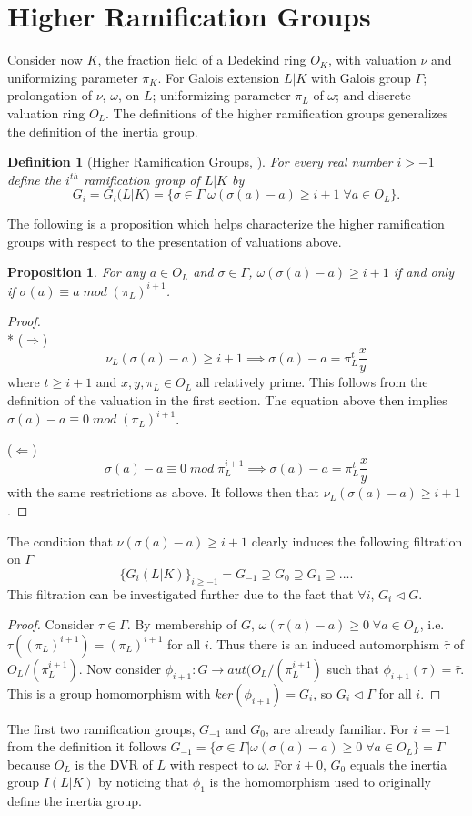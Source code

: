 \documentclass[paper=a4, fontsize=11pt]{scrartcl} %
\numberwithin{equation}{section} %
\numberwithin{figure}{section} %
\numberwithin{table}{section} %
\theoremstyle{break}
\newtheorem{defn}{Definition}
\newtheorem{prop}{Proposition}
\begin{document}
\section{Higher Ramification Groups}
Consider now $K$, the fraction field of a Dedekind ring $O_K$, with valuation $\nu$ and uniformizing parameter $\pi_K$. For Galois extension $L|K$ with Galois group $\Gamma$; prolongation of $\nu$, $\omega$, on $L$; uniformizing parameter $\pi_L$ of $\omega$; and discrete valuation ring $O_L$. The definitions of the higher ramification groups generalizes the definition of the inertia group.
\begin{defn}[Higher Ramification Groups, \cite{Serre}]
For every real number $i > -1$ define the $i^{th}$ ramification group of $L|K$ by
$$
G_i = G_i(L|K) = \{\sigma \in \Gamma | \omega(\sigma(a)-a)\geq i+1 \;\forall a \in O_L\}.
$$
\end{defn}
The following is a proposition which helps characterize the higher ramification groups with respect to the presentation of valuations above.
\begin{prop}
For any $a \in O_L$ and $\sigma \in \Gamma$, $\omega(\sigma(a) - a) \geq i+1$ if and only if  $\sigma(a) \equiv a \; mod \; (\pi_L)^{i+1}$.
\end{prop}
\begin{proof}
\mbox{}\\*
($\Rightarrow$)
$$
\nu_L(\sigma(a)-a) \geq i+1 \implies \sigma(a)-a = \pi_L^{t}\frac{x}{y}
$$
where $t \geq i+1$ and $x,y,\pi_L\in O_L$ all relatively prime. This follows from the definition of the valuation in the first section. The equation above then implies $\sigma(a)-a \equiv 0 \; mod \; (\pi_L)^{i+1}$.

($\Leftarrow$) $$\sigma(a)-a \equiv 0 \; mod \; \pi_L^{i+1} \implies \sigma(a)-a = \pi_L^{t}\frac{x}{y}$$
with the same restrictions as above. It follows then that $\nu_L(\sigma(a)-a) \geq i+1$.
\end{proof}
The condition that $\nu(\sigma(a)-a) \geq i+1$ clearly induces the following filtration on $\Gamma$
$$
\{G_i(L|K)\}_{i\geq -1} = G_{-1} \supseteq G_0 \supseteq G_1 \supseteq \ldots.
$$
This filtration can be investigated further due to the fact that $\forall i$, $G_i \triangleleft G$.
\begin{proof} Consider $\tau \in \Gamma$. By membership of $G$, $\omega(\tau(a) - a) \geq 0\;\forall a\in O_L$, i.e. $\tau((\pi_L)^{i+1}) = (\pi_L)^{i+1}$ for all $i$. Thus there is an induced automorphism $\bar{\tau}$ of $O_L/(\pi_L^{i+1})$. Now consider $\phi_{i+1}:G \to aut(O_L/(\pi_L^{i+1})$ such that $\phi_{i+1}(\tau)=\bar{\tau}$. This is a group homomorphism with $ker(\phi_{i+1})=G_i$, so $G_i \triangleleft \Gamma$ for all $i$.
\end{proof} 
The first two ramification groups, $G_{-1}$ and $G_0$, are already familiar. For $i=-1$ from the definition it follows $G_{-1} = \{\sigma \in \Gamma |\omega(\sigma(a)-a) \geq 0\;\forall a\in O_L\}=\Gamma$ because $O_L$ is the DVR of $L$ with respect to $\omega$. For $i+0$, $G_{0}$ equals the inertia group $I(L|K)$ by noticing that $\phi_1$ is the homomorphism used to originally define the inertia group.
\end{document}
